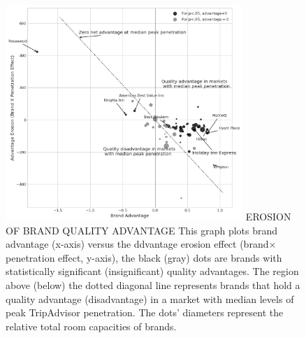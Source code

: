 \begin{figure}[htp]
\FIGURE
{\includegraphics[width=0.8\textwidth,height=\textheight,keepaspectratio]{./Figures/brand_coeff2.png}}
{EROSION OF BRAND QUALITY ADVANTAGE\label{fig:brandvspenetrate}}
{This graph plots brand advantage (x-axis) versus the ddvantage erosion effect (brand$\times$penetration effect, y-axis), the black (gray) dots are brands with statistically significant (insignificant) quality advantages. The region above (below) the dotted diagonal line represents brands that hold a quality advantage (disadvantage) in a market with median levels of peak TripAdvisor penetration. The dots' diameters represent the relative total room capacities of brands.}
\end{figure}
\clearpage


